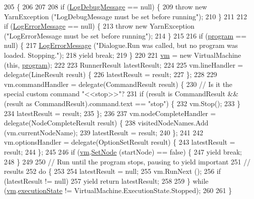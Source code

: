 \begin{DoxyCode}
205                                                                                              \{
206 
207 
208             \textcolor{keywordflow}{if} (\hyperlink{a00036_a381f48bb0fbb294f8cf44ca57f11be31}{LogDebugMessage} == null) \{
209                 \textcolor{keywordflow}{throw} \textcolor{keyword}{new} YarnException (\textcolor{stringliteral}{"LogDebugMessage must be set before running"});
210             \}
211 
212             \textcolor{keywordflow}{if} (\hyperlink{a00036_a9801e83dd044d6498fdf6ebcc6bec5ac}{LogErrorMessage} == null) \{
213                 \textcolor{keywordflow}{throw} \textcolor{keyword}{new} YarnException (\textcolor{stringliteral}{"LogErrorMessage must be set before running"});
214             \}
215 
216             \textcolor{keywordflow}{if} (\hyperlink{a00036_a0a1cca92325f430425d784d416cb5c2b}{program} == null) \{
217                 \hyperlink{a00036_a9801e83dd044d6498fdf6ebcc6bec5ac}{LogErrorMessage} (\textcolor{stringliteral}{"Dialogue.Run was called, but no program was loaded.
       Stopping."});
218                 yield \textcolor{keywordflow}{break};
219             \}
220 
221             \hyperlink{a00036_a8c1319357a9df6cff051328fb33224c7}{vm} = \textcolor{keyword}{new} VirtualMachine (\textcolor{keyword}{this}, \hyperlink{a00036_a0a1cca92325f430425d784d416cb5c2b}{program});
222 
223             RunnerResult latestResult;
224 
225             vm.lineHandler = delegate(LineResult result) \{
226                 latestResult = result;
227             \};
228 
229             vm.commandHandler = delegate(CommandResult result) \{
230                 \textcolor{comment}{// Is it the special custom command "<<stop>>"?}
231                 \textcolor{keywordflow}{if} (result is CommandResult && (result as CommandResult).command.text == \textcolor{stringliteral}{"stop"}) \{
232                     vm.Stop();
233                 \}
234                 latestResult = result;
235             \};
236 
237             vm.nodeCompleteHandler = delegate(NodeCompleteResult result) \{
238                 visitedNodeNames.Add (vm.currentNodeName);
239                 latestResult = result;
240             \};
241 
242             vm.optionsHandler = delegate(OptionSetResult result) \{
243                 latestResult = result;
244             \};
245 
246             \textcolor{keywordflow}{if} (\hyperlink{a00036_a8c1319357a9df6cff051328fb33224c7}{vm}.\hyperlink{a00072_a6364593ea1115d65e34b343422cfbbbd}{SetNode} (startNode) == \textcolor{keyword}{false}) \{
247                 yield \textcolor{keywordflow}{break};
248             \}
249 
250             \textcolor{comment}{// Run until the program stops, pausing to yield important}
251             \textcolor{comment}{// results}
252             \textcolor{keywordflow}{do} \{
253 
254                 latestResult = null;
255                 vm.RunNext ();
256                 \textcolor{keywordflow}{if} (latestResult != null)
257                     yield \textcolor{keywordflow}{return} latestResult;
258 
259             \} \textcolor{keywordflow}{while} (\hyperlink{a00036_a8c1319357a9df6cff051328fb33224c7}{vm}.\hyperlink{a00072_a66491da06023dabfb63d09e6ccbba74f}{executionState} != VirtualMachine.ExecutionState.Stopped);
260 
261         \}
\end{DoxyCode}
